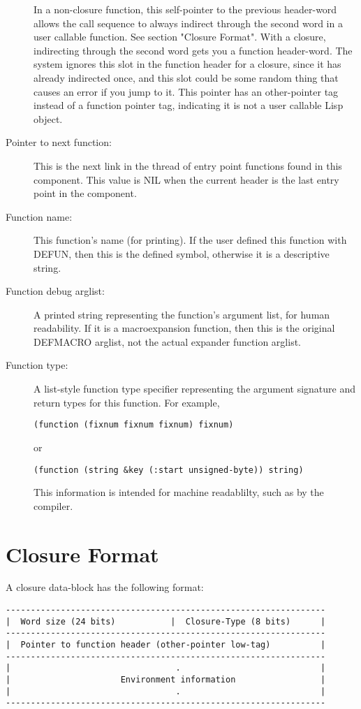 \begin{description}
      In a non-closure function, this self-pointer to the previous header-word
      allows the call sequence to always indirect through the second word in a
      user callable function.  See section "Closure Format".  With a closure,
      indirecting through the second word gets you a function header-word.  The
      system ignores this slot in the function header for a closure, since it
      has already indirected once, and this slot could be some random thing
      that causes an error if you jump to it.  This pointer has an
      other-pointer tag instead of a function pointer tag, indicating it is not
      a user callable Lisp object.
   \item[Pointer to next function:]
      This is the next link in the thread of entry point functions found in
      this component.  This value is NIL when the current header is the last
      entry point in the component.
   \item[Function name:]
      This function's name (for printing).  If the user defined this function
      with DEFUN, then this is the defined symbol, otherwise it is a
      descriptive string.
   \item[Function debug arglist:]
      A printed string representing the function's argument list, for human
      readability.  If it is a macroexpansion function, then this is the
      original DEFMACRO arglist, not the actual expander function arglist.
   \item[Function type:]
      A list-style function type specifier representing the argument signature
      and return types for this function.  For example,
      \begin{verbatim}
(function (fixnum fixnum fixnum) fixnum)
      \end{verbatim}
      or
      \begin{verbatim}
(function (string &key (:start unsigned-byte)) string)
      \end{verbatim}
      This information is intended for machine readablilty, such as by the
      compiler.
\end{description}


\section{Closure Format}

A closure data-block has the following format:
\begin{verbatim}
----------------------------------------------------------------
|  Word size (24 bits)           |  Closure-Type (8 bits)      |
----------------------------------------------------------------
|  Pointer to function header (other-pointer low-tag)          |
----------------------------------------------------------------
|                                 .                            |
|                      Environment information                 |
|                                 .                            |
----------------------------------------------------------------
\end{verbatim}

